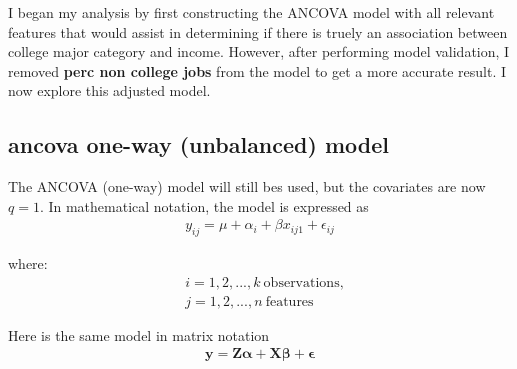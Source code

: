 \documentclass[10pt, twoside, openleft]{article}
\begin{document}
\noindent
I began my analysis by first constructing the ANCOVA model with all relevant features
that would assist in determining if there is truely an association between college
major category and income. However, after performing model validation, I removed
\textbf{perc non college jobs} from the model to get a more accurate result. I now explore
this adjusted model. 
\smallskip

\begin{center}
\subsection{ancova one-way (unbalanced) model}
\vspace{-3ex}
\end{center}

\noindent
The ANCOVA (one-way) model will still bes used, but the covariates are now $q = 1$.
In mathematical notation, the model is expressed as
\begin{equation*}
\begin{aligned}
y_{ij} = \mu + \alpha_{i} + \beta x_{ij1} + \epsilon_{ij}
\end{aligned}
\end{equation*}
\smallskip

where:
\begin{equation*}
\begin{aligned}
& i = 1,2,...,k \ \text{observations}, \\
& j = 1,2,...,n \ \text{features}
\end{aligned}
\end{equation*}
\smallskip

\noindent
Here is the same model in matrix notation
\begin{equation*}
\begin{aligned}
\mathbf{y} = \mathbf{Z} \mathbf{\alpha} + \mathbf{X} \mathbf{\beta} + \mathbf{\epsilon}
\end{aligned}
\end{equation*}
\smallskip
\end{document}
